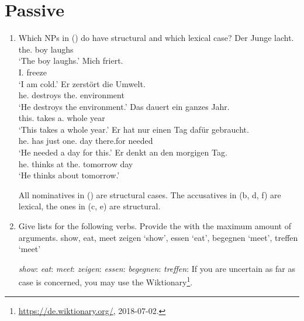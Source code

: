 \section{Passive}

\begin{enumerate}
\item Which NPs in () do have structural and which lexical case?
\eal
\ex 
\gll Der        Junge lacht.\\
     the.\NOM{} boy   laughs\\
\glt `The boy laughs.'
\ex 
\gll Mich friert.\\
     I.\ACC{} freeze\\
\glt `I am cold.'
\ex 
\gll Er zerstört die Umwelt.\\
     he.\NOM{} destroys the.\ACC{} environment\\
\glt `He destroys the environment.'
\ex 
\gll Das dauert ein ganzes Jahr.\\
     this.\NOM{} takes  a.\ACC{} whole year\\
\glt `This takes a whole year.'
\ex 
\gll Er hat nur einen Tag dafür gebraucht.\\
     he.\NOM{} has just one.\ACC{}  day there.for needed\\
\glt `He needed a day for this.'
\ex 
\gll Er denkt an den morgigen Tag.\\
     he.\NOM{} thinks at the.\ACC{} tomorrow day\\
\glt `He thinks about tomorrow.'
\zl

All nominatives in () are structural cases. The accusatives in (b, d, f) are lexical,
the ones in (c, e) are structural.

\item Give \argst lists for the following verbs. Provide the \argstl with the maximum amount of arguments. 
\eal
\ex show, eat, meet \english
\ex zeigen `show', essen `eat', begegnen `meet', treffen `meet' \german
\zl

\eal
\ex \emph{show}: 
\ex \emph{eat}: 
\ex \emph{meet}: 
\zl
\eal
\ex \emph{zeigen}: 
\ex \emph{essen}: 
\ex \emph{begegnen}: 
\ex \emph{treffen}: 
\zl
If you are uncertain as far as case is concerned, you may use the
  Wiktionary\footnote{
\url{https://de.wiktionary.org/}, 2018-07-02.
}.


\end{enumerate}
